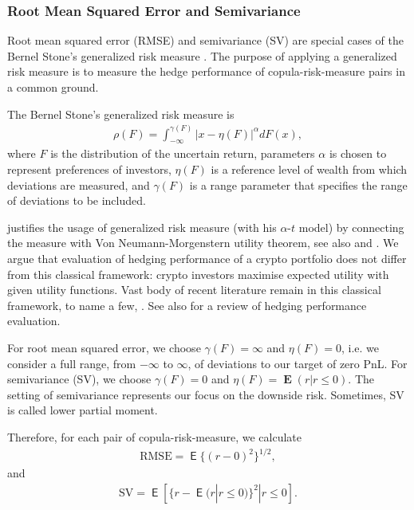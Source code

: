 \subsubsection{Root Mean Squared Error and Semivariance}
Root mean squared error (RMSE) and semivariance (SV) are special cases of the Bernel Stone's generalized risk measure \citep{stone1973general}.
The purpose of applying a generalized risk measure is to measure the hedge performance of copula-risk-measure pairs in a common ground. \medskip

The Bernel Stone's generalized risk measure is
\begin{align*}
    \rho(F) = \int_{-\infty}^{\gamma(F)} \left|x-\eta(F)\right|^\alpha dF(x),
    \end{align*}
where $F$ is the distribution of the uncertain return, parameters $\alpha$ is chosen to represent preferences of investors,
$\eta(F)$ is a reference level of wealth from which deviations are measured, and $\gamma(F)$ is a range parameter that specifies the range of deviations to be included.\medskip

\citet{fishburn1977mean} justifies the usage of generalized risk measure (with his $\alpha$-$t$ model) by connecting the measure with Von Neumann-Morgenstern utility theorem, see also \citet{bawa1975optimal, bawa1978safety}
and \citet{morgenstern1953theory}.
We argue that evaluation of hedging performance of a crypto portfolio does not differ from this classical framework:
crypto investors maximise expected utility with given utility functions.
Vast body of recent literature remain in this classical framework, to name a few, \citet{sebastiao2020bitcoin, deng2020minimum, cui2020composite, oglend2020futures}. \medskip
See also \citet{chen2003futures} for a review of hedging performance evaluation.


For root mean squared error, we choose $\gamma(F)=\infty$ and $\eta(F)=0$, i.e. we consider a full range, from $-\infty$ to $\infty$, of deviations to our target
of zero PnL.
For semivariance (SV), we choose $\gamma(F)=0$ and $\eta(F)=\operatorname{\mathbf{E}}(r|r \leq 0)$.
The setting of semivariance represents our focus on the downside risk.
Sometimes, SV is called lower partial moment. \medskip

Therefore, for each pair of copula-risk-measure, we calculate
\begin{align*}
    \text{RMSE} = \operatorname{\mathsf{E}}\{(r-0)^2\}^{1/2},
    \end{align*}
and
\begin{align*}
    \text{SV} = \operatorname{\mathsf{E}}\left[\{r - \operatorname{\mathsf{E}}(r|r \leq 0)\}^2 | r \leq 0 \right].
\end{align*}

